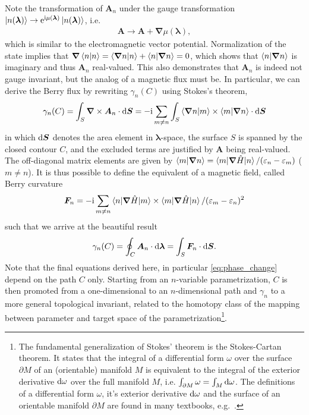 Note the transformation of $\bm A_n$ under the gauge transformation $\ket{n(\bm \lambda)}\rightarrow\mathrm e^{\mathrm i\mu(\bm \lambda)}\ket{n(\bm \lambda)}$, i.e.
\begin{align}
    \bm A \rightarrow {\bm A} + \bm\nabla\mu(\bm \lambda),
\end{align}
which is similar to the electromagnetic vector potential.
Normalization of the state implies that $\bm\nabla \braket{n|n} = \braket{\bm\nabla n|n} + \braket{n|\bm\nabla n} = 0$, which shows that $\braket{n|\bm\nabla n}$ is imaginary and thus ${\bm A_n}$ real-valued.
This also demonstrates that $\bm A_n$ is indeed not gauge invariant, but the analog of a magnetic flux must be.
In particular, we can derive the Berry flux by rewriting $\gamma_n(C)$ using Stokes's theorem,
\begin{align}
    \gamma_n(C) = \int_S{\bm\nabla}\times{\bm A_n}\cdot\mathrm d{\bm S} = -\mathrm i\sum_{m\neq n}\int_S\braket{\bm\nabla n|m}\times\braket{m|\bm\nabla n}\cdot \mathrm d{\bm S}
    \label{eq:berry_phase_stokes_theorem}
\end{align}
in which $\mathrm d{\bm S}$ denotes the area element in ${\bm \lambda}$-space, the surface $S$ is spanned by the closed contour $C$, and the excluded terms are justified by $\bm A$ being real-valued.
The off-diagonal matrix elements are given by $\braket{m|{\bm\nabla} n} = \braket{m|\bm\nabla\hat H|n}/(\varepsilon_n-\varepsilon_m)$ ($m\neq n$).
It is thus possible to define the equivalent of a magnetic field, called Berry curvature
\begin{align}
    \bm F_n = -\mathrm i\sum_{m\neq n}\braket{n|\bm\nabla\hat H|m}\times\braket{m|\bm\nabla\hat H|n}/(\varepsilon_m-\varepsilon_n)^2
\end{align}
such that we arrive at the beautiful result
\begin{align}
    \gamma_n(C) = \oint_C{\bm A_n}\cdot\mathrm d \bm \lambda = \int_S {\bm F_n}\cdot\mathrm d{\bm S}.
    \label{eq:berry_phase_stokes_theorem_2}
\end{align}
Note that the final equations derived here, in particular \cref{eq:phase_change} depend on the path $C$ only.
Starting from an $n$-variable parametrization, $C$ is then promoted from a one-dimensional to an $n$-dimensional path and $\gamma_n$ to a more general topological invariant, related to the homotopy class of the mapping between parameter and target space of the parametrization\footnote{
    The fundamental generalization of Stokes' theorem is the Stokes-Cartan theorem.
    It states that the integral of a differential form $\omega$ over the surface $\partial M$ of an (orientable) manifold $M$ is equivalent to the integral of the exterior derivative $\mathrm d\omega$ over the full manifold $M$, i.e. $\int_{\partial M}\omega = \int_M\mathrm d\omega$.
    The definitions of a differential form $\omega$, it's exterior derivative $\mathrm d\omega$ and the surface of an orientable manifold $\partial M$ are found in many textbooks, e.g.~\cite{Nakahara1990}.
}.


